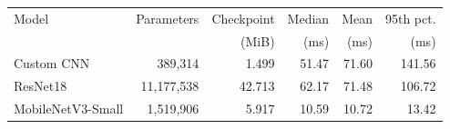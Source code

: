 \begin{tabular}{lrrrrr}
\toprule
Model & Parameters & Checkpoint & Median & Mean & 95th pct. \\
 & & (MiB) & (ms) & (ms) & (ms) \\
\midrule
Custom CNN & 389,314 & 1.499 & 51.47 & 71.60 & 141.56 \\
ResNet18 & 11,177,538 & 42.713 & 62.17 & 71.48 & 106.72 \\
MobileNetV3-Small & 1,519,906 & 5.917 & 10.59 & 10.72 & 13.42 \\
\bottomrule
\end{tabular}
